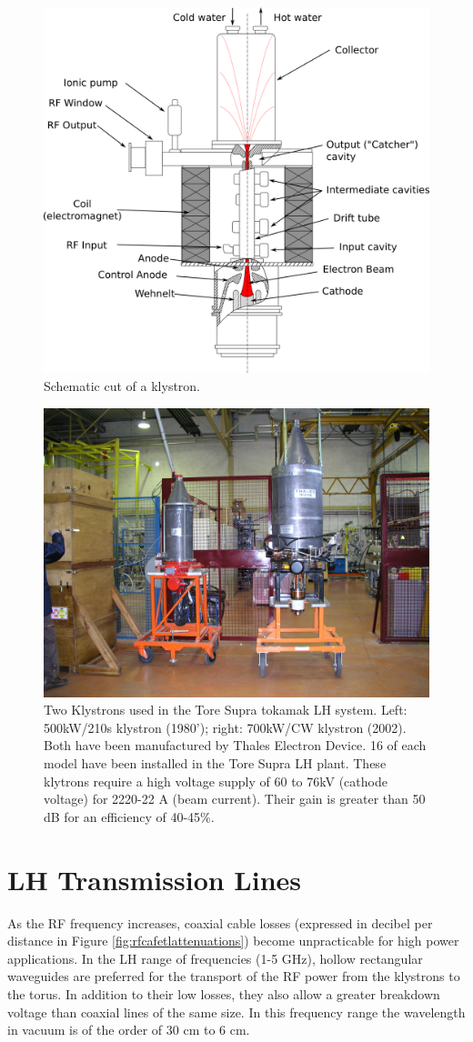 \begin{figure}
\centering
\includegraphics[width=0.6\linewidth]{Figures/LHCD/klystron_cut}
\caption{Schematic cut of a klystron.}
\label{fig:klystroncut}
\end{figure}


\begin{figure}
\centering
\includegraphics[width=0.7\linewidth]{Figures/LHCD/TH20103_TH20103C}
\caption{Two Klystrons used in the Tore Supra tokamak LH system. Left: 500kW/210s klystron (1980'); right: 700kW/CW klystron (2002). Both have been manufactured by Thales Electron Device. 16 of each model have been installed in the Tore Supra LH plant. These klytrons require a high voltage supply of 60 to 76kV (cathode voltage) for 2220-22 A (beam current). Their gain is greater than 50 dB for an efficiency of 40-45\%.}
\label{fig:th20103th20103c}
\end{figure}


\section{LH Transmission Lines}
As the RF frequency increases, coaxial cable losses (expressed in decibel per distance in Figure \ref{fig:rfcafetlattenuations}) become unpracticable for high power applications. In the LH range of frequencies (1-5 GHz), hollow rectangular waveguides are preferred for the transport of the RF power from the klystrons to the torus. In addition to their low losses, they also allow a greater breakdown voltage than coaxial lines of the same size. In this frequency range the wavelength in vacuum is of the order of 30 cm to 6 cm.


